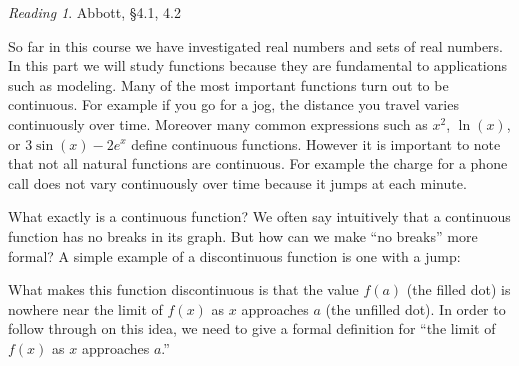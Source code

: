 \documentclass[11pt,oneside]{amsbook}
\theoremstyle{definition}
\theoremstyle{plain}
\theoremstyle{definition}
\theoremstyle{remark}
\newtheorem*{reading}{Reading}
\numberwithin{equation}{section}
\numberwithin{figure}{section}
\begin{document}
\begin{reading}
  Abbott, \S 4.1, 4.2
\end{reading}

So far in this course we have investigated real numbers and sets of real numbers. In this part we will study functions because they are fundamental to applications such as modeling. Many of the most important functions turn out to be continuous. For example if you go for a jog, the distance you travel varies continuously over time. Moreover many common expressions such as $x^2$, $\ln(x)$, or $3\sin(x)-2e^x$ define continuous functions. However it is important to note that not all natural functions are continuous. For example the charge for a phone call does not vary continuously over time because it jumps at each minute.

What exactly is a continuous function? We often say intuitively that a continuous function has no breaks in its graph. But how can we make ``no breaks'' more formal? A simple example of a discontinuous function is one with a jump:
\begin{center}
\end{center}
What makes this function discontinuous is that the value $f(a)$ (the filled dot) is nowhere near the limit of $f(x)$ as $x$ approaches $a$ (the unfilled dot). In order to follow through on this idea, we need to give a formal definition for ``the limit of $f(x)$ as $x$ approaches $a$.''


\end{document}
